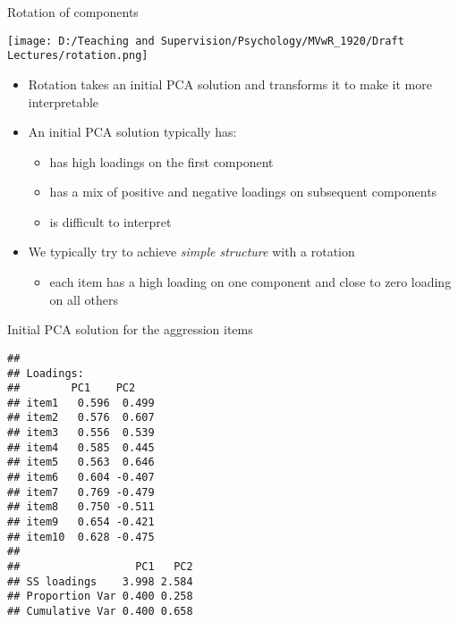 \documentclass[
  ignorenonframetext,
]{beamer}
\newenvironment{Shaded}{\begin{snugshade}}{\end{snugshade}}
\newcommand{\DataTypeTok}[1]{\textcolor[rgb]{0.13,0.29,0.53}{#1}}
\newcommand{\DecValTok}[1]{\textcolor[rgb]{0.00,0.00,0.81}{#1}}
\newcommand{\KeywordTok}[1]{\textcolor[rgb]{0.13,0.29,0.53}{\textbf{#1}}}
\newcommand{\NormalTok}[1]{#1}
\newcommand{\OperatorTok}[1]{\textcolor[rgb]{0.81,0.36,0.00}{\textbf{#1}}}
\newcommand{\StringTok}[1]{\textcolor[rgb]{0.31,0.60,0.02}{#1}}
\providecommand{\tightlist}{%
  \setlength{\itemsep}{0pt}\setlength{\parskip}{0pt}}
\begin{document}
\begin{frame}{Rotation of components}
\protect\hypertarget{rotation-of-components}{}

\texttt{[image: D:/Teaching and Supervision/Psychology/MVwR\_1920/Draft Lectures/rotation.png]}

\begin{itemize}
\tightlist
\item
  Rotation takes an initial PCA solution and transforms it to make it
  more interpretable
\item
  An initial PCA solution typically has:

  \begin{itemize}
  \tightlist
  \item
    has high loadings on the first component
  \item
    has a mix of positive and negative loadings on subsequent components
  \item
    is difficult to interpret
  \end{itemize}
\item
  We typically try to achieve \emph{simple structure} with a rotation

  \begin{itemize}
  \tightlist
  \item
    each item has a high loading on one component and close to zero
    loading on all others
  \end{itemize}
\end{itemize}

\end{frame}

\begin{frame}[fragile]{Initial PCA solution for the aggression items}
\protect\hypertarget{initial-pca-solution-for-the-aggression-items}{}

\begin{Shaded}
\end{Shaded}

\begin{verbatim}
## 
## Loadings:
##        PC1    PC2   
## item1   0.596  0.499
## item2   0.576  0.607
## item3   0.556  0.539
## item4   0.585  0.445
## item5   0.563  0.646
## item6   0.604 -0.407
## item7   0.769 -0.479
## item8   0.750 -0.511
## item9   0.654 -0.421
## item10  0.628 -0.475
## 
##                  PC1   PC2
## SS loadings    3.998 2.584
## Proportion Var 0.400 0.258
## Cumulative Var 0.400 0.658
\end{verbatim}

\end{frame}
\end{document}
